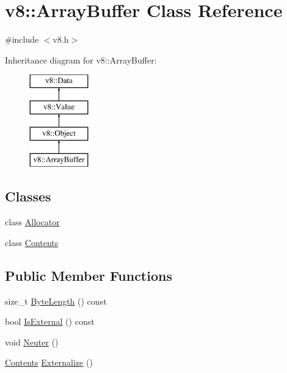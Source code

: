 \hypertarget{classv8_1_1_array_buffer}{}\section{v8\+:\+:Array\+Buffer Class Reference}
\label{classv8_1_1_array_buffer}


{\ttfamily \#include $<$v8.\+h$>$}

Inheritance diagram for v8\+:\+:Array\+Buffer\+:\begin{figure}[H]
\begin{center}
\leavevmode
\includegraphics[height=4.000000cm]{classv8_1_1_array_buffer}
\end{center}
\end{figure}
\subsection*{Classes}
\begin{DoxyCompactItemize}
\item 
class \hyperlink{classv8_1_1_array_buffer_1_1_allocator}{Allocator}
\item 
class \hyperlink{classv8_1_1_array_buffer_1_1_contents}{Contents}
\end{DoxyCompactItemize}
\subsection*{Public Member Functions}
\begin{DoxyCompactItemize}
\item 
size\+\_\+t \hyperlink{classv8_1_1_array_buffer_ab73b98ba6436b57c5a1b3d29429e0199}{Byte\+Length} () const 
\item 
bool \hyperlink{classv8_1_1_array_buffer_a50dd263917559439525048c623425c6f}{Is\+External} () const 
\item 
void \hyperlink{classv8_1_1_array_buffer_a3420f7d38a8fe20e8f40fb82e6acb325}{Neuter} ()
\item 
\hyperlink{classv8_1_1_array_buffer_1_1_contents}{Contents} \hyperlink{classv8_1_1_array_buffer_a8b90b72486cfacb4fbec157f4803f889}{Externalize} ()
\end{DoxyCompactItemize}
